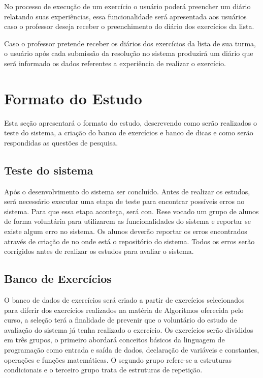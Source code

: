 No processo de execução de um exercício o usuário poderá preencher um diário relatando suas experiências, essa funcionalidade será apresentada aos usuários caso o professor deseja receber o preenchimento do diário dos exercícios da lista. 

Caso o professor pretende receber os diários dos exercícios da lista de sua turma, o usuário após cada submissão da resolução no sistema produzirá um diário que será informado os dados referentes a experiência de realizar o exercício. 

\section{Formato do Estudo}

Esta seção apresentará o formato do estudo, descrevendo como serão realizados o teste do sistema, a criação do banco de exercícios e banco de dicas e como serão respondidas as questões de pesquisa.

\subsection{Teste do sistema}

Após o desenvolvimento do sistema ser concluído. Antes de realizar os estudos, será necessário executar uma etapa de teste para encontrar possíveis erros no sistema. Para que essa etapa aconteça, será con. Rese vocado um grupo de alunos de forma voluntária para utilizarem as funcionalidades do sistema e reportar se existe algum erro no sistema. Os alunos deverão reportar os erros encontrados através de criação de  no  onde está o repositório do sistema. Todos os erros serão corrigidos antes de realizar os estudos para avaliar o sistema.

\subsection{Banco de Exercícios}

O banco de dados de exercícios será criado a partir de exercícios selecionados para diferir dos exercícios realizados na matéria de Algoritmos oferecida pelo curso, a seleção terá a finalidade de prevenir que o voluntário do estudo de avaliação do sistema já tenha realizado o exercício. Os exercícios serão divididos em três grupos, o primeiro abordará conceitos básicos da linguagem de programação como entrada e saída de dados, declaração de variáveis e constantes, operações e funções matemáticas. O segundo grupo refere-se a estruturas condicionais e o terceiro grupo trata de estruturas de repetição.

